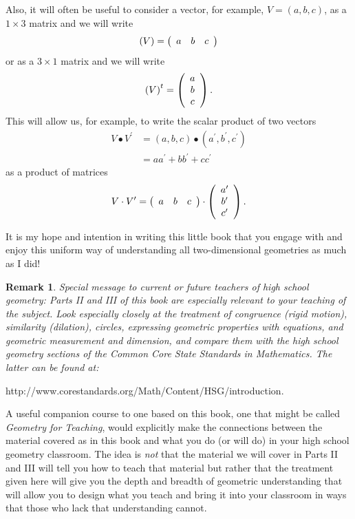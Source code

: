 \documentclass{article}%
\newtheorem{remark}[theorem]{Remark}
\begin{document}
Also, it will often be useful to consider a vector, for example, $V=\left(
a,b,c\right)  $, as a $1\times3$ matrix and we will write%
\[
\left(  V\right)  =\left(
\begin{array}
[c]{ccc}%
a & b & c
\end{array}
\right)
\]
or as a $3\times1$ matrix and we will write%
\[
\left(  V\right)  ^{t}=\left(
\begin{array}
[c]{c}%
a\\
b\\
c
\end{array}
\right)  .
\]
This will allow us, for example, to write the scalar product of two vectors%
\begin{align*}
V\bullet V^{\prime}  &  =\left(  a,b,c\right)  \bullet\left(  a^{\prime
},b^{\prime},c^{\prime}\right) \\
&  =aa^{\prime}+bb^{\prime}+cc^{\prime}%
\end{align*}
as a product of matrices%
\[
V\cdot V^{\prime}=\left(
\begin{array}
[c]{ccc}%
a & b & c
\end{array}
\right)  \cdot\left(
\begin{array}
[c]{c}%
a^{\prime}\\
b^{\prime}\\
c^{\prime}%
\end{array}
\right)  .
\]


It is my hope and intention in writing this little book that you engage with
and enjoy this uniform way of understanding all two-dimensional geometries as
much as I did!

\begin{remark}
Special message to current or future teachers of high school geometry: Parts
II and III of this book are especially relevant to your teaching of the
subject. Look especially closely at the treatment of congruence (rigid
motion), similarity (dilation), circles, expressing geometric properties with
equations, and geometric measurement and dimension, and compare them with the
high school geometry sections of the Common Core State Standards in
Mathematics. The latter can be found at:
\end{remark}

\begin{center}
http://www.corestandards.org/Math/Content/HSG/introduction.
\end{center}

A useful companion course to one based on this book, one that might be called
\textit{Geometry for Teaching}, would explicitly make the connections between
the material covered as in this book and what you do (or will do) in your high
school geometry classroom. The idea is \textit{not} that the material we will
cover in Parts II and III will tell you how to teach that material but rather
that the treatment given here will give you the depth and breadth of geometric
understanding that will allow you to design what you teach and bring it into
your classroom in ways that those who lack that understanding cannot.
\end{document}
